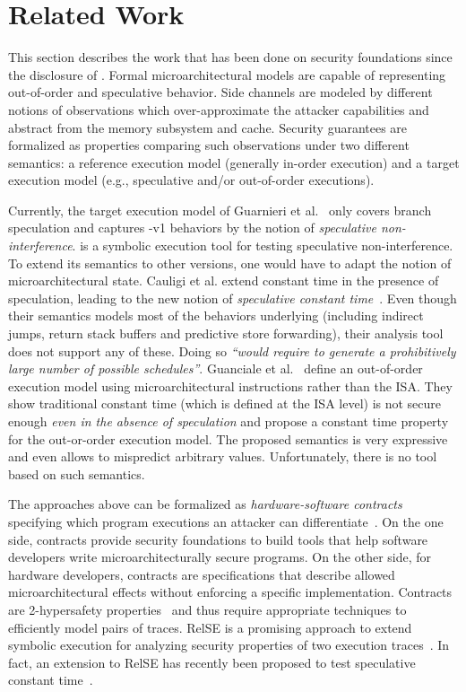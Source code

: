 \documentclass[conference]{IEEEtran}
\begin{document}
\section{Related Work}
\label{sec:related}

This section describes the work that has been done on security foundations since the disclosure of \spectre.
Formal microarchitectural models are capable of representing out-of-order and speculative behavior.
Side channels are modeled by different notions of observations which over-approximate the attacker capabilities and abstract from the memory subsystem and cache.
Security guarantees are formalized as properties comparing such observations under two different semantics: a reference execution model (generally in-order execution) and a target execution model (e.g., speculative and/or out-of-order executions).

Currently, the target execution model of Guarnieri et al.~\cite{GuarnieriKMRS20} only covers branch speculation and captures \spectre-v1 behaviors by the notion of \emph{speculative non-interference}.
\spectector is a symbolic execution tool for testing speculative non-interference.
To extend its semantics to other \spectre versions, one would have to adapt the notion of microarchitectural state.
Cauligi et al. extend constant time in the presence of speculation, leading to the new notion of \emph{speculative constant time}~\cite{CauligiDGTSRB20}.
Even though their semantics models most of the behaviors underlying \spectre (including indirect jumps, return stack buffers and predictive store forwarding), their analysis tool \pitchforktool does not support any of these.
Doing so \emph{\enquote{would require to generate a prohibitively large number of possible schedules}}. 
Guanciale et al.~\cite{GuancialeBD20} define an out-of-order execution model using microarchitectural instructions rather than the ISA.
They show traditional constant time (which is defined at the ISA level) is not secure enough \emph{even in the absence of speculation} and propose a constant time property for the out-or-order execution model.
The proposed semantics is very expressive and even allows to mispredict arbitrary values.
Unfortunately, there is no tool based on such semantics.

The approaches above can be formalized as \emph{hardware-software contracts} specifying which program executions an attacker can differentiate~\cite{speculative-contracts}.
On the one side, contracts provide security foundations to build tools that help software developers write microarchitecturally secure programs.
On the other side, for hardware developers, contracts are specifications that describe allowed microarchitectural effects without enforcing a specific implementation.
Contracts are 2-hypersafety properties~\cite{ClarksonS10} and thus require appropriate techniques to efficiently model pairs of traces.
RelSE is a promising approach to extend symbolic execution for analyzing security properties of two execution traces~\cite{binsec}.
In fact, an extension to RelSE has recently been proposed to test speculative constant time~\cite{DanielBR20}.
\end{document}
